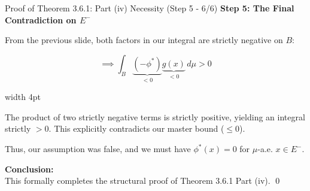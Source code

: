 \documentclass[10pt, aspectratio=169, xcolor=dvipsnames]{beamer}
\newcommand{\lead}[1]{{\color{UniBlue}\bfseries #1}}
\begin{document}
\begin{frame}{Proof of Theorem 3.6.1: Part (iv) Necessity (Step 5 - 6/6)}
    \lead{Step 5: The Final Contradiction on $E^-$}\\
    \vspace{0.4cm}
    
    From the previous slide, both factors in our integral are strictly negative on $B$:
    
    \vspace{0.2cm}
    \[ \implies \int_B \underbrace{(-\phi^*)}_{< 0} \underbrace{g(x)}_{< 0} \, d\mu > 0 \]
    
    \vspace{0.6cm}
    \noindent
    {\color{Teal}\vrule width 4pt}%
    \hspace{10pt}%
    \begin{minipage}{\dimexpr\textwidth-14pt\relax}
        \color{Slate}
        The product of two strictly negative terms is strictly positive, yielding an integral strictly $> 0$. This explicitly contradicts our master bound ($\le 0$). 
        
        \vspace{0.3cm}
        Thus, our assumption was false, and we must have $\phi^*(x) = 0$ for $\mu$-a.e. $x \in E^-$.
        
        \vspace{0.3cm}
        \textbf{Conclusion:}\\
        This formally completes the structural proof of Theorem 3.6.1 Part (iv). \qed
    \end{minipage}
\end{frame}
\end{document}

